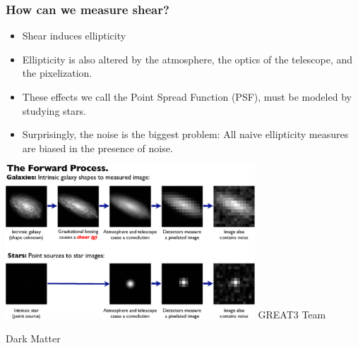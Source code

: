 \documentclass{beamer}
\begin{document}
\frame
{
    \frametitle{How can we measure shear?}

    \begin{itemize}

        \item Shear induces ellipticity

        \item Ellipticity is also altered by the atmosphere, the optics
            of the telescope, and the pixelization.
        
        \item These effects we call the Point Spread Function (PSF),
            must be modeled by studying stars.

        \item Surprisingly, the noise is the biggest problem:  All
            naive ellipticity measures are biased in the presence of
            noise.

    \end{itemize}
    \begin{center}
        \includegraphics[width=0.7\textwidth]{great08-forward-process.png}
        \newline
        {\tiny GREAT3 Team}
    \end{center}
}


\frame
{

    {\Huge Dark Matter}

}
\end{document}

